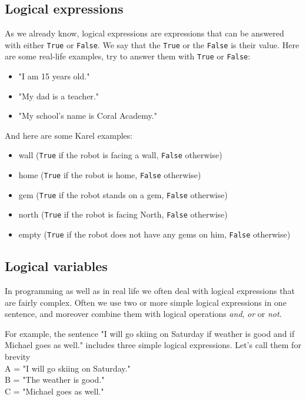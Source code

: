 {{{{\subsection{Logical expressions}
As we already know, logical expressions are expressions that can be answered with either {\tt True} or 
{\tt False}. We say that the {\tt True} or the {\tt False} is their value. Here are some 
real-life examples, try to answer them with {\tt True} or {\tt False}:

\begin{itemize}
\item "I am 15 years old."
\item "My dad is a teacher."
\item "My school's name is Coral Academy."
\end{itemize}
And here are some Karel examples:
\begin{itemize}
\item wall ({\tt True} if the robot is facing a wall, {\tt False} otherwise)
\item home ({\tt True} if the robot is home, {\tt False} otherwise)
\item gem ({\tt True} if the robot stands on a gem, {\tt False} otherwise)
\item north ({\tt True} if the robot is facing North, {\tt False} otherwise)
\item empty ({\tt True} if the robot does not have any gems on him, {\tt False} otherwise)
\end{itemize}

\subsection{Logical variables}

In programming as well as in real life we often deal with logical expressions that are 
fairly complex. Often we use two or more simple logical expressions in one sentence, 
and moreover combine them with logical operations {\em and}, {\em or} or {\em not}.

For example, the sentence "I will go skiing on Saturday if weather is good and if 
Michael goes as well." includes three simple logical expressions. Let's call 
them for brevity\\

\noindent
A = "I will go skiing on Saturday."\\
B = "The weather is good."\\
C = "Michael goes as well."\\

}}}}
